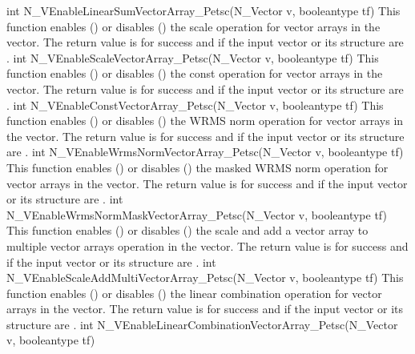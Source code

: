 {
  int N\_VEnableLinearSumVectorArray\_Petsc(N\_Vector v, booleantype tf)
}
{
  This function enables () or disables () the scale
  operation for vector arrays in the {\petsc} vector. The return value is  for
  success and  if the input vector or its  structure are .
}
{
  int N\_VEnableScaleVectorArray\_Petsc(N\_Vector v, booleantype tf)
}
{
  This function enables () or disables () the const
  operation for vector arrays in the {\petsc} vector. The return value is  for
  success and  if the input vector or its  structure are .
}
{
  int N\_VEnableConstVectorArray\_Petsc(N\_Vector v, booleantype tf)
}
{
  This function enables () or disables () the WRMS norm
  operation for vector arrays in the {\petsc} vector. The return value is  for
  success and  if the input vector or its  structure are .
}
{
  int N\_VEnableWrmsNormVectorArray\_Petsc(N\_Vector v, booleantype tf)
}
{
  This function enables () or disables () the masked WRMS
  norm operation for vector arrays in the {\petsc} vector. The return value is
   for success and  if the input vector or its  structure are
  .
}
{
  int N\_VEnableWrmsNormMaskVectorArray\_Petsc(N\_Vector v, booleantype tf)
}
{
  This function enables () or disables () the scale and
  add a vector array to multiple vector arrays operation in the {\petsc} vector. The
  return value is  for success and  if the input vector or its
   structure are .
}
{
  int N\_VEnableScaleAddMultiVectorArray\_Petsc(N\_Vector v, booleantype tf)
}
{
  This function enables () or disables () the linear
  combination operation for vector arrays in the {\petsc} vector. The return value
  is  for success and  if the input vector or its  structure
  are .
}
{
  int N\_VEnableLinearCombinationVectorArray\_Petsc(N\_Vector v, booleantype tf)
}
